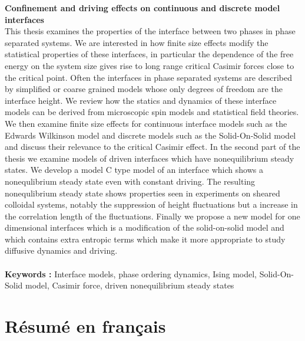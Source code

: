 {\bf Confinement and driving effects on continuous and discrete model interfaces}\\
This thesis examines the properties  of the interface between two phases in  phase separated systems. We are interested 
in how finite size effects modify the statistical properties of these interfaces, in particular  the dependence of the free energy on the system size 
gives rise to long range critical Casimir forces close to the critical point. Often the interfaces in phase separated systems are
described by simplified or coarse grained models whose only degrees of freedom are the interface height. We review how the statics and dynamics of
these  interface models can be derived from microscopic spin models and statistical field theories. We then examine finite size effects for 
continuous interface models such as the Edwards Wilkinson model and discrete models such as the Solid-On-Solid model  and discuss their 
relevance to the critical Casimir effect. In the second part of the thesis we examine models of driven interfaces which have nonequilibrium steady states. 
We develop a model C type model of an interface which shows a nonequlibrium steady
state even with constant driving. The resulting nonequlibrium steady state shows properties seen in experiments on sheared colloidal systems,
notably the suppression of height fluctuations but   a increase in the  correlation length of the fluctuations. Finally we propose a new model for
one dimensional interfaces which is a modification of  the solid-on-solid model and which contains extra entropic terms which make it more
appropriate to study diffusive dynamics and driving.
\\ \\
{\bf Keywords : }  Interface models, phase ordering dynamics, Ising model, Solid-On-Solid model, Casimir force, driven nonequilibrium steady states

\chapter*{Résumé en français} 

